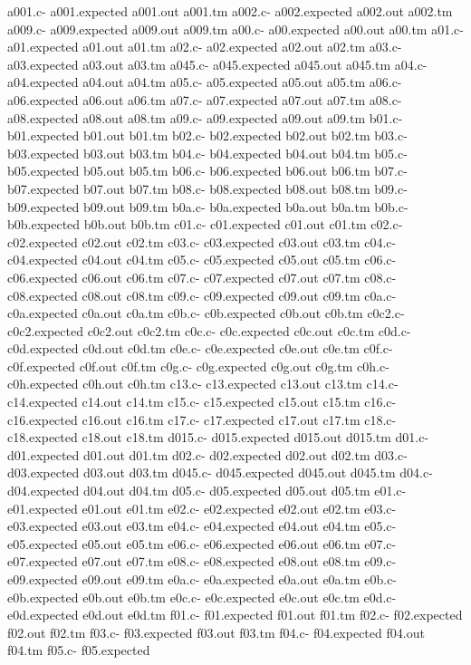 \documentclass[12pt]{book}
\begin{document}
a001.c-
a001.expected
a001.out
a001.tm
a002.c-
a002.expected
a002.out
a002.tm
a009.c-
a009.expected
a009.out
a009.tm
a00.c-
a00.expected
a00.out
a00.tm
a01.c-
a01.expected
a01.out
a01.tm
a02.c-
a02.expected
a02.out
a02.tm
a03.c-
a03.expected
a03.out
a03.tm
a045.c-
a045.expected
a045.out
a045.tm
a04.c-
a04.expected
a04.out
a04.tm
a05.c-
a05.expected
a05.out
a05.tm
a06.c-
a06.expected
a06.out
a06.tm
a07.c-
a07.expected
a07.out
a07.tm
a08.c-
a08.expected
a08.out
a08.tm
a09.c-
a09.expected
a09.out
a09.tm
b01.c-
b01.expected
b01.out
b01.tm
b02.c-
b02.expected
b02.out
b02.tm
b03.c-
b03.expected
b03.out
b03.tm
b04.c-
b04.expected
b04.out
b04.tm
b05.c-
b05.expected
b05.out
b05.tm
b06.c-
b06.expected
b06.out
b06.tm
b07.c-
b07.expected
b07.out
b07.tm
b08.c-
b08.expected
b08.out
b08.tm
b09.c-
b09.expected
b09.out
b09.tm
b0a.c-
b0a.expected
b0a.out
b0a.tm
b0b.c-
b0b.expected
b0b.out
b0b.tm
c01.c-
c01.expected
c01.out
c01.tm
c02.c-
c02.expected
c02.out
c02.tm
c03.c-
c03.expected
c03.out
c03.tm
c04.c-
c04.expected
c04.out
c04.tm
c05.c-
c05.expected
c05.out
c05.tm
c06.c-
c06.expected
c06.out
c06.tm
c07.c-
c07.expected
c07.out
c07.tm
c08.c-
c08.expected
c08.out
c08.tm
c09.c-
c09.expected
c09.out
c09.tm
c0a.c-
c0a.expected
c0a.out
c0a.tm
c0b.c-
c0b.expected
c0b.out
c0b.tm
c0c2.c-
c0c2.expected
c0c2.out
c0c2.tm
c0c.c-
c0c.expected
c0c.out
c0c.tm
c0d.c-
c0d.expected
c0d.out
c0d.tm
c0e.c-
c0e.expected
c0e.out
c0e.tm
c0f.c-
c0f.expected
c0f.out
c0f.tm
c0g.c-
c0g.expected
c0g.out
c0g.tm
c0h.c-
c0h.expected
c0h.out
c0h.tm
c13.c-
c13.expected
c13.out
c13.tm
c14.c-
c14.expected
c14.out
c14.tm
c15.c-
c15.expected
c15.out
c15.tm
c16.c-
c16.expected
c16.out
c16.tm
c17.c-
c17.expected
c17.out
c17.tm
c18.c-
c18.expected
c18.out
c18.tm
d015.c-
d015.expected
d015.out
d015.tm
d01.c-
d01.expected
d01.out
d01.tm
d02.c-
d02.expected
d02.out
d02.tm
d03.c-
d03.expected
d03.out
d03.tm
d045.c-
d045.expected
d045.out
d045.tm
d04.c-
d04.expected
d04.out
d04.tm
d05.c-
d05.expected
d05.out
d05.tm
e01.c-
e01.expected
e01.out
e01.tm
e02.c-
e02.expected
e02.out
e02.tm
e03.c-
e03.expected
e03.out
e03.tm
e04.c-
e04.expected
e04.out
e04.tm
e05.c-
e05.expected
e05.out
e05.tm
e06.c-
e06.expected
e06.out
e06.tm
e07.c-
e07.expected
e07.out
e07.tm
e08.c-
e08.expected
e08.out
e08.tm
e09.c-
e09.expected
e09.out
e09.tm
e0a.c-
e0a.expected
e0a.out
e0a.tm
e0b.c-
e0b.expected
e0b.out
e0b.tm
e0c.c-
e0c.expected
e0c.out
e0c.tm
e0d.c-
e0d.expected
e0d.out
e0d.tm
f01.c-
f01.expected
f01.out
f01.tm
f02.c-
f02.expected
f02.out
f02.tm
f03.c-
f03.expected
f03.out
f03.tm
f04.c-
f04.expected
f04.out
f04.tm
f05.c-
f05.expected
\end{document}
